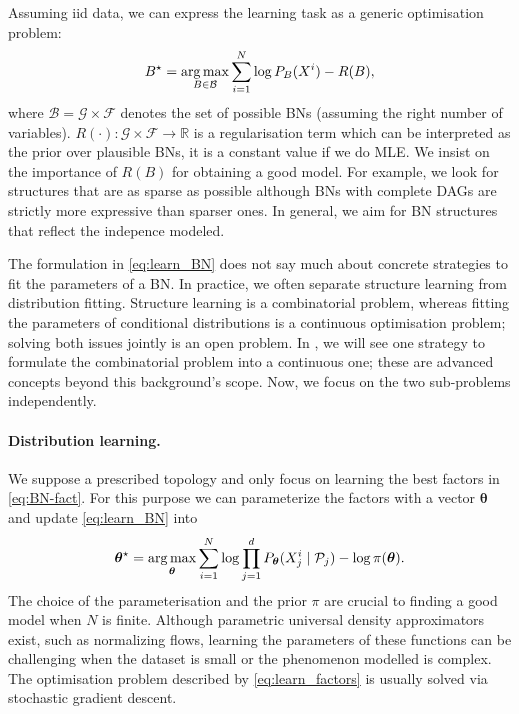 Assuming iid data, we can express the learning task as a generic optimisation problem:
\begin{align}
  B^\star  = \operatorname*{arg\,max}_{B\in\mathcal{B}} \sum_{i=1}^N \log P_B(X^i) - R(B), \label{eq:learn_BN}
\end{align}
where $\mathcal{B} = \mathcal{G} \times \mathcal{F}$ denotes the set of possible BNs (assuming the right number of variables). $R(\cdot): \mathcal{G} \times \mathcal{F} \rightarrow \mathbb{R}$ is a regularisation term which can be interpreted as the prior over plausible BNs, it is a constant value if we do MLE. We insist on the importance of $R(B)$ for obtaining a good model. For example, we look for structures that are as sparse as possible although BNs with complete DAGs are strictly more expressive than sparser ones. In general, we aim for BN structures that reflect the indepence modeled.

The formulation in \ref{eq:learn_BN} does not say much about concrete strategies to fit the parameters of a BN. In practice, we often separate structure learning from distribution fitting. Structure learning is a combinatorial problem, whereas fitting the parameters of conditional distributions is a continuous optimisation problem; solving both issues jointly is an open problem. In , we will see one strategy to formulate the combinatorial problem into a continuous one; these are advanced concepts beyond this background's scope. Now, we focus on the two sub-problems independently.

\paragraph{Distribution learning.}
We suppose a prescribed topology and only focus on learning the best factors in \eqref{eq:BN-fact}. For this purpose we can parameterize the factors with a vector $\bm \theta$ and update \eqref{eq:learn_BN} into
\begin{align}
  {\bm \theta}^\star  = \operatorname*{arg\,max}_{\bm \theta} \sum_{i=1}^N \log \prod^d_{j=1}P_{\bm \theta}(X_j^i\mid \mathcal{P}_j) - \log \pi(\bm \theta).
 \label{eq:learn_factors}
\end{align}
The choice of the parameterisation and the prior $\pi$ are crucial to finding a good model when $N$ is finite. Although parametric universal density approximators exist, such as normalizing flows, learning the parameters of these functions can be challenging when the dataset is small or the phenomenon modelled is complex. The optimisation problem described by \eqref{eq:learn_factors} is usually solved via stochastic gradient descent.

